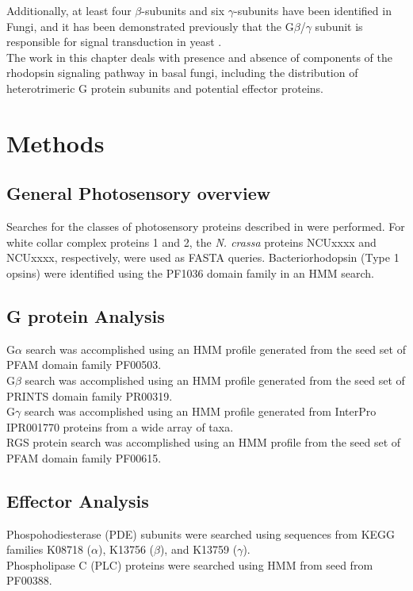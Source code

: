 \indent Additionally, at least four $\beta$-subunits and six $\gamma$-subunits have been identified \cite{Hepler1992} in Fungi, and it has been demonstrated previously that the G$\beta$/$\gamma$ subunit is responsible for signal transduction in yeast \cite{Bolker1998}.\\
\indent The work in this chapter deals with presence and absence of components of the rhodopsin signaling pathway in basal fungi, including the distribution of heterotrimeric G protein subunits and potential effector proteins.\\
\section{Methods}
\subsection*{General Photosensory overview}
Searches for the classes of photosensory proteins described in \cite{Idnurm2010} were performed. For white collar complex proteins 1 and 2, the \textit{N. crassa} proteins NCUxxxx and NCUxxxx, respectively, were used as FASTA queries. Bacteriorhodopsin (Type 1 opsins) were identified using the PF1036 domain family in an HMM search.\\
\subsection*{G protein Analysis}
\indent G$\alpha$ search was accomplished using an HMM profile generated from the seed set of PFAM domain family PF00503.\\
\indent G$\beta$ search was accomplished using an HMM profile generated from the seed set of PRINTS domain family PR00319.\\
\indent G$\gamma$ search was accomplished using an HMM profile generated from InterPro IPR001770 proteins from a wide array of taxa.\\
\indent RGS protein search was accomplished using an HMM profile from the seed set of PFAM domain family PF00615.\\
\subsection*{Effector Analysis}
\indent Phospohodiesterase (PDE) subunits were searched using sequences from KEGG families K08718 ($\alpha$), K13756 ($\beta$), and K13759 ($\gamma$). \\
\indent Phospholipase C (PLC) proteins were searched using HMM from seed from PF00388.\\
